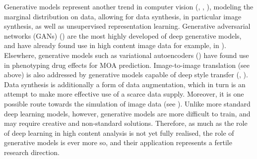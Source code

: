 Generative models represent another trend in computer vision (\cite{kingma2013auto}, \cite{goodfellow2014explaining}, \cite{oord2016pixel}), modeling the marginal distribution on data, allowing for data synthesis, in particular image synthesis, as well as unsupervised representation learning. Generative adversarial networks (GANs) (\cite{goodfellow2014explaining}) are the most highly developed of deep generative models, and have already found use in high content image data for example, in \cite{osokin2017gans}). Elsewhere, generative models such as variational autoencoders (\cite{kingma2013auto}) have found use in phenotyping drug effects for MOA prediction. Image-to-image translation (see above) is also addressed by generative models capable of deep style transfer (\cite{isola2017image}, \cite{zhu2017unpaired}). Data synthesis is additionally a form of data augmentation, which in turn is an attempt to make more effective use of a scarce data supply. Moreover, it is one possible route towards the simulation of image data (see \cite{ihle2019unsupervised}). Unlike more standard deep learning models, however, generative models are more difficult to train, and may require creative and non-standard solutions. Therefore, as much as the role of deep learning in high content analysis is not yet fully realised, the role of generative models is ever more so, and their application represents a fertile research direction.

